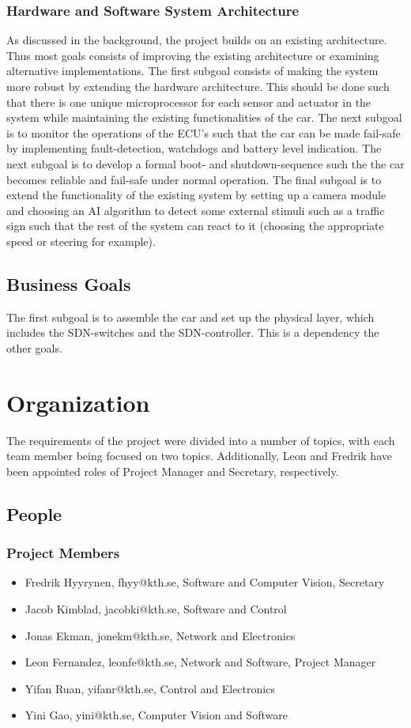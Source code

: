 \documentclass[11pt, titlepage]{article} %
\begin{document}
\subsubsection{Hardware and Software System Architecture}
As discussed in the background, the project builds on an existing
architecture. Thus most goals consists of improving the existing
architecture or examining alternative implementations. The first subgoal
consists of making the system more robust by extending the hardware
architecture. This should be done such that there is one unique
microprocessor for each sensor and actuator in the system while maintaining
the existing functionalities of the car. The next subgoal is to monitor the
operations of the ECU’s such that the car can be made fail-safe by
implementing fault-detection, watchdogs and battery level indication.
The next subgoal is to develop a formal boot- and shutdown-sequence such
the the car becomes reliable and fail-safe under normal operation. The
final subgoal is to extend the functionality of the existing system by
setting up a camera module and choosing an AI algorithm to detect some
external stimuli such as a traffic sign such that the rest of the system
can react to it (choosing the appropriate speed or steering for example). 

\subsection{Business Goals}
The first subgoal is to assemble the car and set up the physical layer,
which includes the SDN-switches and the SDN-controller. This is a
dependency the other goals. 

\section{Organization}
The requirements of the project were divided into a number of topics,
with each team member being focused on two topics. Additionally, Leon and
Fredrik have been appointed roles of Project Manager and Secretary,
respectively.
\subsection{People}
\subsubsection{Project Members}
\begin{itemize}
\item Fredrik Hyyrynen, fhyy@kth.se, Software and Computer Vision, Secretary
\item Jacob Kimblad, jacobki@kth.se, Software and Control
\item Jonas Ekman, jonekm@kth.se, Network and Electronics
\item Leon Fernandez, leonfe@kth.se, Network and Software, Project Manager
\item Yifan Ruan, yifanr@kth.se, Control and Electronics
\item Yini Gao, yini@kth.se, Computer Vision and Software
\end{itemize}
\end{document}
